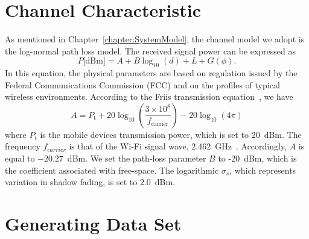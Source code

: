 \section{Channel Characteristic}

As mentioned in Chapter~\ref{chapter:SystemModel}, the channel model we adopt is the log-normal path loss model.
The received signal power can be expressed as
\begin{equation} \label{equation:Power}
P \text{[dBm]}
= A + B \log_{10}(d) + L + G (\phi) .
\end{equation}
In this equation, the physical parameters are based on regulation issued by the Federal Communications Commission (FCC) and on the profiles of typical wireless environments.
According to the Friis transmission equation~\cite{friis1946note}, we have
\begin{equation*}
A = P_{\mathrm{t}} + 20 \log_{10} \left( \frac{3 \times 10^8}{f_{\mathrm{carrier}}} \right) - 20\log_{10}(4\pi) 
\end{equation*}
where $P_{t}$ is the mobile devices transmission power, which is set to 20~dBm.
The frequency $f_{carrier}$ is that of the Wi-Fi signal wave, 2.462~GHz~\cite{goldsmith2005wireless}.
Accordingly, $A$ is equal to $-20.27$~dBm.
We set the path-loss parameter $B$ to -20~dBm, which is the coefficient associated with free-space.
The logarithmic $\sigma_{s}$, which represents variation in shadow fading, is set to 2.0~dBm.


\section{Generating Data Set}

